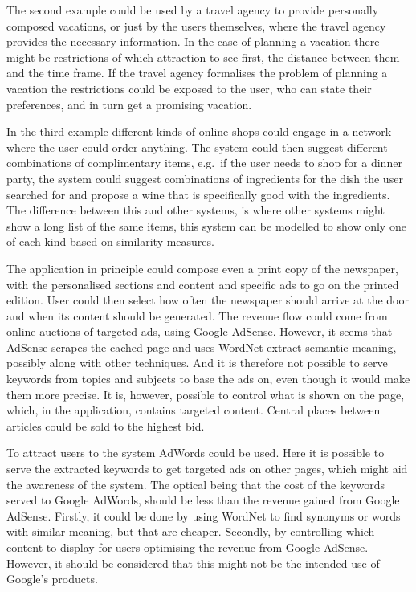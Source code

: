 The second example could be used by a travel agency to provide personally composed vacations, or just by the users themselves, where the travel agency provides the necessary information. In the case of planning a vacation there might be restrictions of which attraction to see first, the distance between them and the time frame. If the travel agency formalises the problem of planning a vacation the restrictions could be exposed to the user, who can state their preferences, and in turn get a promising vacation.

In the third example different kinds of online shops could engage in a network where the user could order anything. The system could then suggest different combinations of complimentary items, e.g.\ if the user needs to shop for a dinner party, the system could suggest combinations of ingredients for the dish the user searched for and propose a wine that is specifically good with the ingredients. The difference between this and other systems, is where other systems might show a long list of the same items, this system can be modelled to show only one of each kind based on similarity measures.

The application in principle could compose even a print copy of the newspaper, with the personalised sections and content and specific ads to go on the printed edition. User could then select how often the newspaper should arrive at the door and when its content should be generated.
\clearpage
The revenue flow could come from online auctions of targeted ads, using Google AdSense. However, it seems that AdSense scrapes the cached page and uses WordNet extract semantic meaning, possibly along with other techniques. And it is therefore not possible to serve keywords from topics and subjects to base the ads on, even though it would make them more precise. It is, however, possible to control what is shown on the page, which, in the application, contains targeted content. Central places between articles could be sold to the highest bid. 

To attract users to the system AdWords could be used. Here it is possible to serve the extracted keywords to get targeted ads on other pages, which might aid the awareness of the system. The optical being that the cost of the keywords served to Google AdWords, should be less than the revenue gained from Google AdSense. Firstly, it could be done by using WordNet to find synonyms or words with similar meaning, but that are cheaper. Secondly, by controlling which content to display for users optimising the revenue from Google AdSense. However, it should be considered that this might not be the intended use of Google's products.

